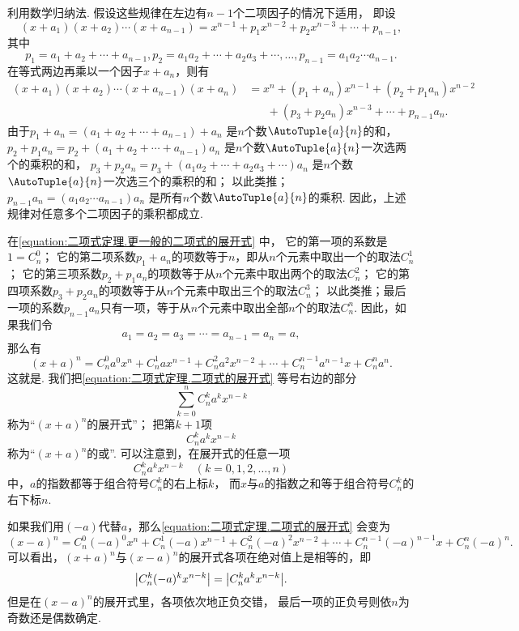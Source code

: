 利用数学归纳法.
假设这些规律在左边有\(n-1\)个二项因子的情况下适用，
即设\[
	(x+a_1)(x+a_2)\dotsm(x+a_{n-1})
	= x^{n-1}+p_1 x^{n-2}+p_2 x^{n-3}+\dotsb+p_{n-1},
\]
其中\[
	p_1 = a_1+a_2+\dotsb+a_{n-1},
	p_2 = a_1a_2+\dotsb+a_2a_3+\dotsb,
	\dotsc,
	p_{n-1} = a_1 a_2 \dotsm a_{n-1}.
\]
在等式两边再乘以一个因子\(x+a_n\)，则有\begin{equation}\label{equation:二项式定理.更一般的二项式的展开式}
	\begin{split}
	(x+a_1)(x+a_2)\dotsm(x+a_{n-1})(x+a_n)
	&= x^n + (p_1+a_n)x^{n-1}
		+ (p_2+p_1a_n)x^{n-2} \\
		&\hspace{20pt}+ (p_3+p_2a_n)x^{n-3}
		+ \dotsb + p_{n-1} a_n.
	\end{split}
\end{equation}
由于\(p_1+a_n = (a_1+a_2+\dotsb+a_{n-1})+a_n\)
是\(n\)个数\(\AutoTuple{a}{n}\)的和，
\(p_2+p_1a_n = p_2+(a_1+a_2+\dotsb+a_{n-1})a_n\)
是\(n\)个数\(\AutoTuple{a}{n}\)一次选两个的乘积的和，
\(p_3+p_2a_n = p_3+(a_1a_2+\dotsb+a_2a_3+\dotsb)a_n\)
是\(n\)个数\(\AutoTuple{a}{n}\)一次选三个的乘积的和；
以此类推；\(p_{n-1} a_n = (a_1 a_2 \dotsm a_{n-1})a_n\)
是所有\(n\)个数\(\AutoTuple{a}{n}\)的乘积.
因此，上述规律对任意多个二项因子的乘积都成立.

在\cref{equation:二项式定理.更一般的二项式的展开式} 中，
它的第一项的系数是\(1 = C_n^0\)；
它的第二项系数\(p_1+a_n\)的项数等于\(n\)，即从\(n\)个元素中取出一个的取法\(C_n^1\)；
它的第三项系数\(p_2+p_1a_n\)的项数等于从\(n\)个元素中取出两个的取法\(C_n^2\)；
它的第四项系数\(p_3+p_2a_n\)的项数等于从\(n\)个元素中取出三个的取法\(C_n^3\)；
以此类推；最后一项的系数\(p_{n-1} a_n\)只有一项，等于从\(n\)个元素中取出全部\(n\)个的取法\(C_n^n\).
因此，如果我们令\[
	a_1 = a_2 = a_3 = \dotsb = a_{n-1} = a_n = a,
\]
那么有
\begin{equation}\label{equation:二项式定理.二项式的展开式}
	(x+a)^n
	= C_n^0 a^0 x^n + C_n^1 a x^{n-1} + C_n^2 a^2 x^{n-2}
	+ \dotsb + C_n^{n-1} a^{n-1} x + C_n^n a^n.
\end{equation}
这就是.
我们把\cref{equation:二项式定理.二项式的展开式} 等号右边的部分\[
	\sum_{k=0}^n C_n^k a^k x^{n-k}
\]称为“\((x+a)^n\)的展开式”；
把第\(k+1\)项\[
	C_n^k a^k x^{n-k}
\]称为“\((x+a)^n\)的或”.
可以注意到，在展开式的任意一项\[
	C_n^k a^k x^{n-k}
	\quad(k=0,1,2,\dotsc,n)
\]中，\(a\)的指数都等于组合符号\(C_n^k\)的右上标\(k\)，
而\(x\)与\(a\)的指数之和等于组合符号\(C_n^k\)的右下标\(n\).

如果我们用\((-a)\)代替\(a\)，那么\cref{equation:二项式定理.二项式的展开式} 会变为\[
	(x-a)^n = C_n^0 (-a)^0 x^n + C_n^1 (-a) x^{n-1} + C_n^2 (-a)^2 x^{n-2}
	+ \dotsb + C_n^{n-1} (-a)^{n-1} x + C_n^n (-a)^n.
\]
可以看出，\((x+a)^n\)与\((x-a)^n\)的展开式各项在绝对值上是相等的，即\[
	\abs{C_n^k (-a)^k x^{n-k}}
	= \abs{C_n^k a^k x^{n-k}}.
\]
但是在\((x-a)^n\)的展开式里，各项依次地正负交错，
最后一项的正负号则依\(n\)为奇数还是偶数确定.

